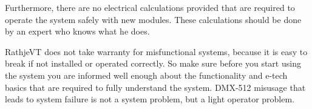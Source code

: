 \documentclass[10pt]{datasheet}
\begin{document}
Furthermore, there are no electrical calculations provided that are required to operate the system safely with new modules. These calculations
should be done by an expert who knows what he does. 

RathjeVT does not take warranty for misfunctional systems, because it is easy to break if not installed or operated correctly. So make sure before
you start using the system you are informed well enough about the functionality and e-tech basics that are required to fully understand the system.
DMX-512 misusage that leads to system failure is not a system problem, but a light operator problem.
\end{document}
